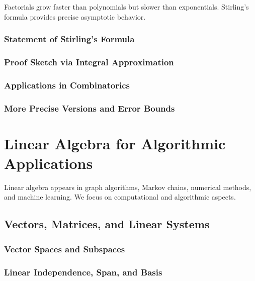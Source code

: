 \begin{subsectionintro}
Factorials grow faster than polynomials but slower than exponentials.
Stirling's formula provides precise asymptotic behavior.
\end{subsectionintro}

\subsubsection{Statement of Stirling's Formula}
\subsubsection{Proof Sketch via Integral Approximation}
\subsubsection{Applications in Combinatorics}
\subsubsection{More Precise Versions and Error Bounds}

\section{Linear Algebra for Algorithmic Applications}
\label{sec:linear-algebra}

\begin{sectionintro}
Linear algebra appears in graph algorithms, Markov chains, numerical methods,
and machine learning. We focus on computational and algorithmic aspects.
\end{sectionintro}

\subsection{Vectors, Matrices, and Linear Systems}
\label{subsec:vectors-matrices}

\subsubsection{Vector Spaces and Subspaces}
\subsubsection{Linear Independence, Span, and Basis}
